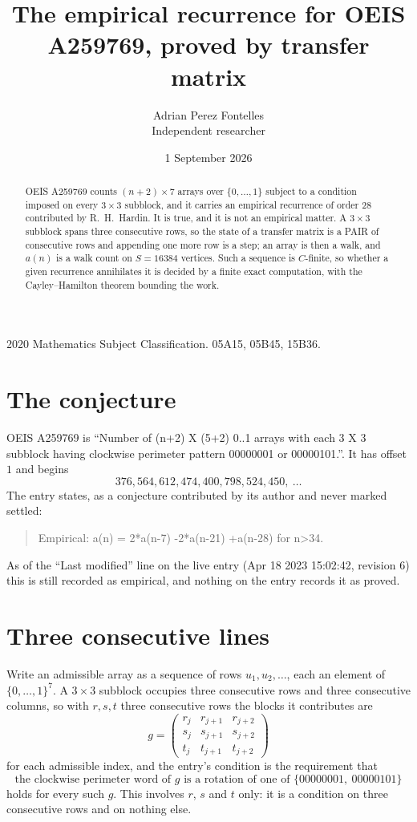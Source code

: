 \documentclass[11pt,a4paper]{article}
\title{The empirical recurrence for OEIS A259769, proved by transfer matrix}
\author{Adrian Perez Fontelles\\ \small Independent researcher}
\date{1 September 2026}
\theoremstyle{plain}
\theoremstyle{definition}
\begin{document}
\maketitle

\begin{abstract}
OEIS A259769 counts $(n+2)\times7$ arrays over $\{0,\dots,1\}$ subject to a condition imposed on
every $3\times3$ subblock, and it carries an empirical recurrence of order $28$
contributed by R.~H.~Hardin. It is true, and it is not an empirical matter. A $3\times3$
subblock spans three consecutive rows, so the state of a transfer matrix is a PAIR of
consecutive rows and appending one more row is a step; an array is then a walk, and
$a(n)$ is a walk count on $S=16384$ vertices. Such a sequence is $C$-finite, so whether a given
recurrence annihilates it is decided by a finite exact computation, with the Cayley--Hamilton
theorem bounding the work.
\end{abstract}

\noindent\small 2020 Mathematics Subject Classification. 05A15, 05B45, 15B36.\normalsize

\section{The conjecture}

OEIS A259769 is ``Number of (n+2) X (5+2) 0..1 arrays with each 3 X 3 subblock having clockwise perimeter pattern 00000001 or 00000101.''. It has offset $1$ and begins
\[
376, 564, 612, 474, 400, 798, 524, 450,\ \dots
\]
The entry states, as a conjecture contributed by its author and never marked settled:
\begin{quote}
Empirical: a(n) = 2*a(n-7) -2*a(n-21) +a(n-28) for n>34.
\end{quote}
As of the ``Last modified'' line on the live entry (Apr 18 2023 15:02:42, revision 6) this is still
recorded as empirical, and nothing on the entry records it as proved.

\section{Three consecutive lines}

Write an admissible array as a sequence of rows $u_1,u_2,\dots$, each an element of
$\{0,\dots,1\}^{7}$. A $3\times3$ subblock occupies three consecutive rows and
three consecutive columns, so with $r,s,t$ three consecutive rows the blocks it
contributes are
\[
g=\begin{pmatrix}r_j&r_{j+1}&r_{j+2}\\ s_j&s_{j+1}&s_{j+2}\\ t_j&t_{j+1}&t_{j+2}\end{pmatrix}
\]
for each admissible index, and the entry's condition is the requirement that
\[
\text{the clockwise perimeter word of }g\text{ is a rotation of one of }\{00000001,\ 00000101\}
\]
holds for every such $g$. This involves $r$, $s$ and $t$ only: it is a condition on
three consecutive rows and on nothing else.
\end{document}
